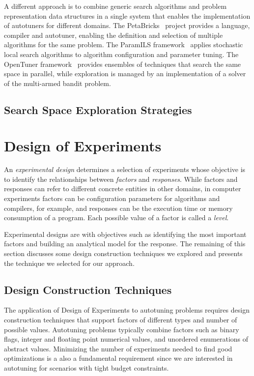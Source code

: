 \documentclass[conference]{IEEEtran}
\begin{document}
A different approach is to combine generic search algorithms and problem
representation data structures in a single system that enables the
implementation of autotuners for different domains. The
PetaBricks~\cite{ansel2009petabricks} project provides a language,
compiler and autotuner, enabling the definition and selection of multiple
algorithms for the same problem. The ParamILS
framework~\cite{hutter2009paramils} applies stochastic local search
algorithms to algorithm configuration and parameter tuning. The OpenTuner
framework~\cite{ansel2014opentuner} provides ensembles of techniques that
search the same space in parallel, while exploration is managed by an
implementation of a solver of the multi-armed bandit problem.
\subsection{Search Space Exploration Strategies}
\label{sec:orgc6b19e3}
\section{Design of Experiments}
\label{sec:orgdb30905}
An \emph{experimental design} determines a selection of experiments whose objective
is to identify the relationships between \emph{factors} and \emph{responses}. While
factors and responses can refer to different concrete entities in other domains,
in computer experiments factors can be configuration parameters for algorithms
and compilers, for example, and responses can be the execution time or memory
consumption of a program. Each possible value of a factor is called a \emph{level}.

Experimental designs are with objectives such as identifying the most important
factors and building an analytical model for the response. The remaining of this
section discusses some design construction techniques we explored and presents
the technique we selected for our approach.
\subsection{Design Construction Techniques}
\label{sec:orgfc2e2af}
The application of Design of Experiments to autotuning problems requires design
construction techniques that support factors of different types and number of
possible values. Autotuning problems typically combine factors such as binary
flags, integer and floating point numerical values, and unordered enumerations
of abstract values. Minimizing the number of experiments needed to find good
optimizations is a also a fundamental requirement since we are interested in
autotuning for scenarios with tight budget constraints.
\end{document}
